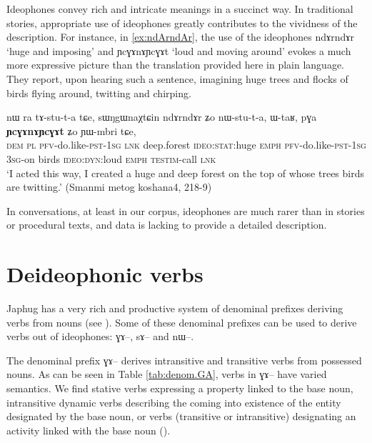 \documentclass[oldfontcommands,oneside,a4paper,11pt]{article}
\newcommand{\ipa}[1]{{\phon \mbox{#1}}} %
\begin{document}
  
Ideophones convey  rich and intricate meanings in a succinct way. In traditional stories, appropriate use of ideophones greatly contributes to the vividness of the description. For instance, in  \ref{ex:ndArndAr}, the use of the ideophones \ipa{ndɤrndɤr}     `huge and imposing'	and 	\ipa{ɲcɣɤnɤɲcɣɤt} `loud and moving around' evokes  a much more expressive picture than the  translation provided here in plain language. They report, upon hearing such a sentence, imagining huge trees and flocks of birds flying around, twitting and chirping.

\begin{exe}
\ex \label{ex:ndArndAr}
 \gll 
\ipa{nɯ}  	\ipa{ra}  	\ipa{tɤ-stu-t-a}  	\ipa{tɕe,}  	\ipa{sɯŋgɯnaχtɕin}  	\ipa{ndɤrndɤr}  	\ipa{ʑo}  	\ipa{nɯ-stu-t-a,}  	\ipa{ɯ-taʁ,}  	\ipa{pɣa}  	\ipa{\textbf{ɲcɣɤnɤɲcɣɤt}}  	\ipa{ʑo}  	\ipa{ɲɯ-mbri}  	\ipa{tɕe,}  \\
\textsc{dem} \textsc{pl} \textsc{pfv}-do.like-\textsc{pst-1sg} \textsc{lnk} deep.forest \textsc{ideo:stat}:huge \textsc{emph} \textsc{pfv}-do.like-\textsc{pst-1sg} \textsc{3sg}-on birds \textsc{ideo:dyn}:loud \textsc{emph} \textsc{testim}-call \textsc{lnk} \\
\glt `I acted this way, I created a huge and deep forest on the top of whose trees birds are twitting.' (Smanmi metog koshana4, 218-9)
\end{exe}



In conversations, at least in our corpus, ideophones are much rarer than in stories or procedural texts, and data is lacking to provide a detailed description. 

  
 \section{Deideophonic verbs} \label{sec:deideophonic}
 Japhug has a very rich and productive   system of denominal prefixes deriving verbs from nouns (see \citealt{jacques12incorp, jacques14antipassive}). Some of these denominal prefixes can be used to derive verbs out of ideophones: \ipa{ɣɤ--}, \ipa{sɤ--} and \ipa{nɯ--}.
 
 The denominal prefix \ipa{ɣɤ--} derives intransitive and transitive verbs from possessed nouns. As can be seen in Table \ref{tab:denom.GA},  verbs in \ipa{ɣɤ--} have  varied semantics. We find stative verbs expressing a property linked to the base noun, intransitive dynamic verbs describing the coming into existence of the entity designated by the base noun, or  verbs  (transitive or intransitive) designating an activity linked with the base noun (\citealt[1218]{jacques12incorp}).
 
\end{document}
